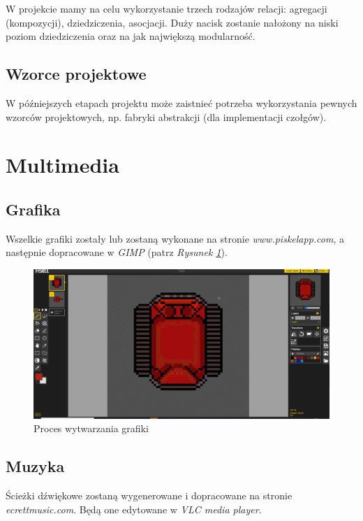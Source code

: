 \documentclass[a4paper]{article}
\begin{document}
\quad W projekcie mamy na celu wykorzystanie trzech rodzaj\'ow relacji: agregacji (kompozycji), dziedziczenia, asocjacji. 
Du\.zy nacisk zostanie na\l{}o\.zony na niski poziom dziedziczenia oraz na jak najwi\k{e}ksz\k{a} modularno\'s\'c. 

\subsection{Wzorce projektowe}

\quad W p\'o\'zniejszych etapach projektu mo\.ze zaistnie\'c potrzeba wykorzystania pewnych wzorc\'ow projektowych, np. fabryki abstrakcji (dla implementacji czo\l{}g\'ow). 

\section{Multimedia}

\subsection{Grafika}

\quad Wszelkie grafiki zosta\l{}y lub zostan\k{a} wykonane na stronie \textit{www.piskelapp.com}, a nast\k{e}pnie dopracowane w \textit{GIMP} (patrz  \textit{Rysunek \ref{fig:piskel}}).

 \begin{figure}[h]
                \centering
                \includegraphics[scale=0.23]{Piskel.png}
		\caption{Proces wytwarzania grafiki}
		\label{fig:piskel}
\end{figure}

\subsection{Muzyka}

\quad \'Scie\.zki d\'zwi\k{e}kowe zostan\k{a} wygenerowane i dopracowane na stronie \textit{ecrettmusic.com}.
B\k{e}d\k{a} one edytowane w \textit{VLC media player}.
\end{document}
